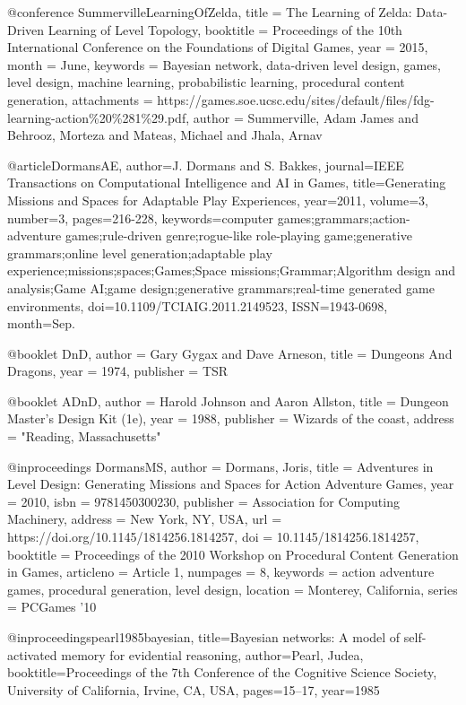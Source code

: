 @conference {SummervilleLearningOfZelda,
	title = {The Learning of Zelda: Data-Driven Learning of Level Topology},
	booktitle = {Proceedings of the 10th International Conference on the Foundations of Digital Games},
	year = {2015},
	month = {June},
	keywords = {Bayesian network, data-driven level design, games, level design, machine learning, probabilistic learning, procedural content generation},
	attachments = {https://games.soe.ucsc.edu/sites/default/files/fdg-learning-action\%20\%281\%29.pdf},
	author = {Summerville, Adam James and Behrooz, Morteza and Mateas, Michael and Jhala, Arnav}
}

@article{DormansAE,
author={J. {Dormans} and S. {Bakkes}},
journal={IEEE Transactions on Computational Intelligence and AI in Games},
title={Generating Missions and Spaces for Adaptable Play Experiences},
year={2011},
volume={3},
number={3},
pages={216-228},
keywords={computer games;grammars;action-adventure games;rule-driven genre;rogue-like role-playing game;generative grammars;online level generation;adaptable play experience;missions;spaces;Games;Space missions;Grammar;Algorithm design and analysis;Game AI;game design;generative grammars;real-time generated game environments},
doi={10.1109/TCIAIG.2011.2149523},
ISSN={1943-0698},
month={Sep.}
}

@booklet {DnD,
author = {Gary {Gygax} and Dave {Arneson}},
title = {Dungeons And Dragons},
year = {1974},
publisher = {TSR}
}

@booklet {ADnD,
author = {Harold {Johnson} and Aaron {Allston}},
title = {Dungeon Master's Design Kit (1e)},
year = {1988},
publisher = {Wizards of the coast},
address = "Reading, Massachusetts"
}

@inproceedings {DormansMS,
author = {Dormans, Joris},
title = {Adventures in Level Design: Generating Missions and Spaces for Action Adventure Games},
year = {2010},
isbn = {9781450300230},
publisher = {Association for Computing Machinery},
address = {New York, NY, USA},
url = {https://doi.org/10.1145/1814256.1814257},
doi = {10.1145/1814256.1814257},
booktitle = {Proceedings of the 2010 Workshop on Procedural Content Generation in Games},
articleno = {Article 1},
numpages = {8},
keywords = {action adventure games, procedural generation, level design},
location = {Monterey, California},
series = {PCGames ’10}
}

@inproceedings{pearl1985bayesian,
  title={Bayesian networks: A model of self-activated memory for evidential reasoning},
  author={Pearl, Judea},
  booktitle={Proceedings of the 7th Conference of the Cognitive Science Society, University of California, Irvine, CA, USA},
  pages={15--17},
  year={1985}
}
  
